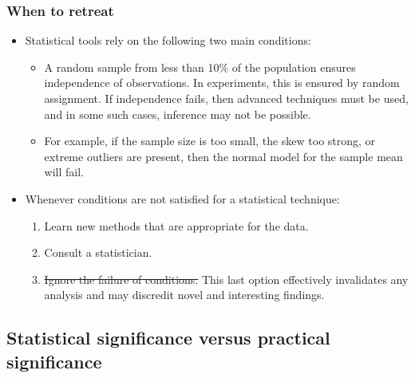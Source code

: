 \begin{frame}
\frametitle{When to retreat}

\begin{itemize}

\item Statistical tools rely on the following two main conditions:
\begin{itemize}
\item {} A random sample from less than 10\% of the population ensures independence of observations. In experiments, this is ensured by random assignment. If independence fails, then advanced techniques must be used, and in some such cases, inference may not be possible.
\item {} For example, if the sample size is too small, the skew too strong, or extreme outliers are present, then the normal model for the sample mean will fail.
\end{itemize}

\item Whenever conditions are not satisfied for a statistical technique:
\begin{enumerate}
\item Learn new methods that are appropriate for the data. 
\item Consult a statistician.
\item \sout{Ignore the failure of conditions.} This last option effectively invalidates any analysis and may discredit novel and interesting findings.
\end{enumerate}

\end{itemize}

\end{frame}


\subsection{Statistical significance versus practical significance}


